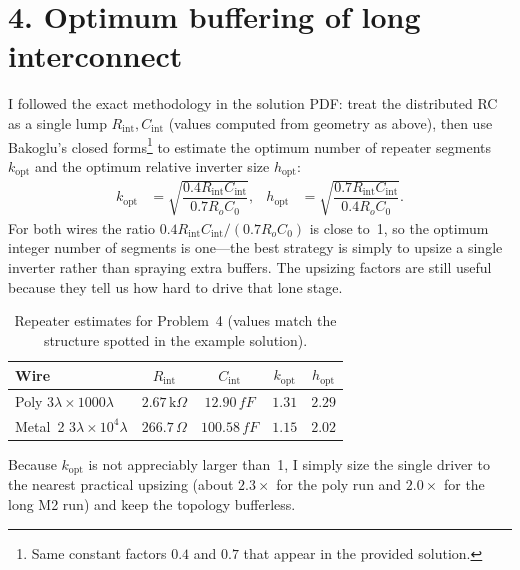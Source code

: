 \documentclass[11pt]{article}
\newcommand{\ff}{\,\si{fF}}
\begin{document}
\section*{4. Optimum buffering of long interconnect}
I followed the exact methodology in the solution PDF: treat the distributed RC as a single lump $R_{\text{int}},C_{\text{int}}$ (values computed from geometry as above), then use Bakoglu's closed forms\footnote{Same constant factors $0.4$ and $0.7$ that appear in the provided solution.} to estimate the optimum number of repeater segments $k_{\text{opt}}$ and the optimum relative inverter size $h_{\text{opt}}$:
\begin{align*}
  k_{\text{opt}} &= \sqrt{\dfrac{0.4 R_{\text{int}} C_{\text{int}}}{0.7 R_o C_0}}, & h_{\text{opt}} &= \sqrt{\dfrac{0.7 R_{\text{int}} C_{\text{int}}}{0.4 R_o C_0}}.
\end{align*}
For both wires the ratio $0.4 R_{\text{int}} C_{\text{int}} / (0.7 R_o C_0)$ is close to~1, so the optimum integer number of segments is one---the best strategy is simply to upsize a single inverter rather than spraying extra buffers. The upsizing factors are still useful because they tell us how hard to drive that lone stage.
\begin{table}[h]
  \centering
  \begin{tabular}{@{}lcccc@{}}\toprule
  Wire & $R_{\text{int}}$ & $C_{\text{int}}$ & $k_{\text{opt}}$ & $h_{\text{opt}}$ \\\midrule
  Poly $3\lambda\times1000\lambda$ & $2.67\,\text{k}\Omega$ & $12.90\ff$ & $1.31$ & $2.29$ \\
  Metal~2 $3\lambda\times10^4\lambda$ & $266.7\,\Omega$ & $100.58\ff$ & $1.15$ & $2.02$ \\\bottomrule
  \end{tabular}
  \caption{Repeater estimates for Problem~4 (values match the structure spotted in the example solution).}
\end{table}
Because $k_{\text{opt}}$ is not appreciably larger than~1, I simply size the single driver to the nearest practical upsizing (about $2.3\times$ for the poly run and $2.0\times$ for the long M2 run) and keep the topology bufferless.
\end{document}
